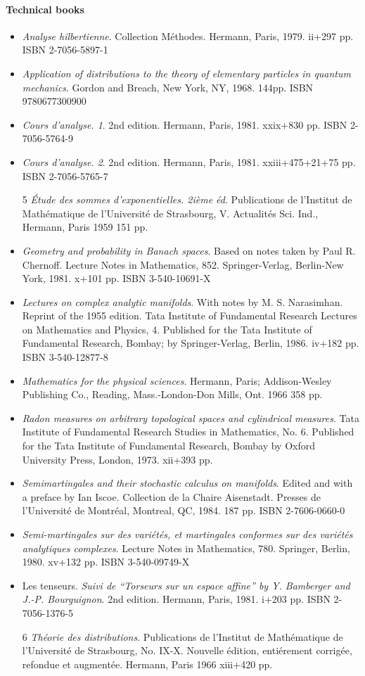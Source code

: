 \documentclass{article}
\begin{document}
\paragraph{Technical books}
\begin{itemize}
	\item \textit{Analyse hilbertienne}. Collection Méthodes. Hermann, Paris, 1979. ii+297 pp. ISBN 2-7056-5897-1
	\item \textit{Application of distributions to the theory of elementary particles in quantum mechanics}. Gordon and Breach, New York, NY, 1968. 144pp. ISBN 9780677300900
	\item \textit{Cours d'analyse. 1}. 2nd edition. Hermann, Paris, 1981. xxix+830 pp. ISBN 2-7056-5764-9
	\item \textit{Cours d'analyse. 2}. 2nd edition. Hermann, Paris, 1981. xxiii+475+21+75 pp. ISBN 2-7056-5765-7
	\item [5] \textit{Étude des sommes d'exponentielles. 2ième éd}. Publications de l'Institut de Mathématique de l'Université de Strasbourg, V. Actualités Sci. Ind., Hermann, Paris 1959 151 pp.
	\item \textit{Geometry and probability in Banach spaces}. Based on notes taken by Paul R. Chernoff. Lecture Notes in Mathematics, 852. Springer-Verlag, Berlin-New York, 1981. x+101 pp. ISBN 3-540-10691-X
	\item \textit{Lectures on complex analytic manifolds}. With notes by M. S. Narasimhan. Reprint of the 1955 edition. Tata Institute of Fundamental Research Lectures on Mathematics and Physics, 4. Published for the Tata Institute of Fundamental Research, Bombay; by Springer-Verlag, Berlin, 1986. iv+182 pp. ISBN 3-540-12877-8
	\item \textit{Mathematics for the physical sciences}. Hermann, Paris; Addison-Wesley Publishing Co., Reading, Mass.-London-Don Mills, Ont. 1966 358 pp.
	\item \textit{Radon measures on arbitrary topological spaces and cylindrical measures}. Tata Institute of Fundamental Research Studies in Mathematics, No. 6. Published for the Tata Institute of Fundamental Research, Bombay by Oxford University Press, London, 1973. xii+393 pp.
	\item \textit{Semimartingales and their stochastic calculus on manifolds}. Edited and with a preface by Ian Iscoe. Collection de la Chaire Aisenstadt. Presses de l'Université de Montréal, Montreal, QC, 1984. 187 pp. ISBN 2-7606-0660-0
	\item \textit{Semi-martingales sur des variétés, et martingales conformes sur des variétés analytiques complexes}. Lecture Notes in Mathematics, 780. Springer, Berlin, 1980. xv+132 pp. ISBN 3-540-09749-X
	\item Les tenseurs. \textit{Suivi de ``Torseurs sur un espace affine'' by Y. Bamberger and J.-P. Bourguignon}. 2nd edition. Hermann, Paris, 1981. i+203 pp. ISBN 2-7056-1376-5
	\item [6] \textit{Théorie des distributions}. Publications de l'Institut de Mathématique de l'Université de Strasbourg, No. IX-X. Nouvelle édition, entiérement corrigée, refondue et augmentée. Hermann, Paris 1966 xiii+420 pp.
\end{itemize}
\end{document}
